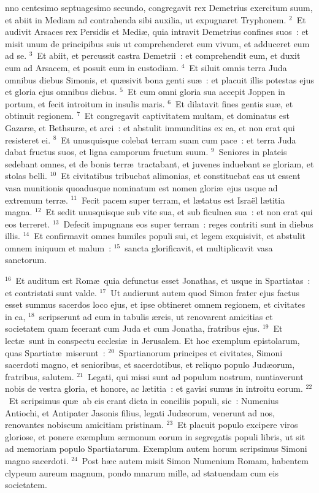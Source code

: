 \bchapter
{}nno centesimo septuagesimo secundo, congregavit rex Demetrius exercitum suum, et abiit in Mediam ad contrahenda sibi auxilia, ut expugnaret Tryphonem.
${}^{2}$~Et audivit Arsaces rex Persidis et Medi\ae , quia intravit Demetrius confines suos~: et misit unum de principibus suis ut comprehenderet eum vivum, et adduceret eum ad se.
${}^{3}$~Et abiit, et percussit castra Demetrii~: et comprehendit eum, et duxit eum ad Arsacem, et posuit eum in custodiam.
${}^{4}$~Et siluit omnis terra Juda omnibus diebus Simonis, et qu\ae sivit bona genti su\ae~: et placuit illis potestas ejus et gloria ejus omnibus diebus.
${}^{5}$~Et cum omni gloria sua accepit Joppen in portum, et fecit introitum in insulis maris.
${}^{6}$~Et dilatavit fines gentis su\ae , et obtinuit regionem.
${}^{7}$~Et congregavit captivitatem multam, et dominatus est Gazar\ae , et Bethsur\ae , et arci~: et abstulit immunditias ex ea, et non erat qui resisteret ei.
${}^{8}$~Et unusquisque colebat terram suam cum pace~: et terra Juda dabat fructus suos, et ligna camporum fructum suum.
${}^{9}$~Seniores in plateis sedebant omnes, et de bonis terr\ae\ tractabant, et juvenes induebant se gloriam, et stolas belli.
${}^{10}$~Et civitatibus tribuebat alimonias, et constituebat eas ut essent vasa munitionis quoadusque nominatum est nomen glori\ae\ ejus usque ad extremum terr\ae .
${}^{11}$~Fecit pacem super terram, et l\ae tatus est Isra\"el l\ae titia magna.
${}^{12}$~Et sedit unusquisque sub vite sua, et sub ficulnea sua~: et non erat qui eos terreret.
${}^{13}$~Defecit impugnans eos super terram~: reges contriti sunt in diebus illis.
${}^{14}$~Et confirmavit omnes humiles populi sui, et legem exquisivit, et abstulit omnem iniquum et malum~:
${}^{15}$~sancta glorificavit, et multiplicavit vasa sanctorum.


${}^{16}$~Et auditum est Rom\ae\ quia defunctus esset Jonathas, et usque in Spartiatas~: et contristati sunt valde.
${}^{17}$~Ut audierunt autem quod Simon frater ejus factus esset summus sacerdos loco ejus, et ipse obtineret omnem regionem, et civitates in ea,
${}^{18}$~scripserunt ad eum in tabulis \ae reis, ut renovarent amicitias et societatem quam fecerant cum Juda et cum Jonatha, fratribus ejus.
${}^{19}$~Et lect\ae\ sunt in conspectu ecclesi\ae\ in Jerusalem. Et hoc exemplum epistolarum, quas Spartiat\ae\ miserunt~:
${}^{20}$~Spartianorum principes et civitates, Simoni sacerdoti magno, et senioribus, et sacerdotibus, et reliquo populo Jud\ae orum, fratribus, salutem.
${}^{21}$~Legati, qui missi sunt ad populum nostrum, nuntiaverunt nobis de vestra gloria, et honore, ac l\ae titia~: et gavisi sumus in introitu eorum.
${}^{22}$~Et scripsimus qu\ae\ ab eis erant dicta in conciliis populi, sic~: Numenius Antiochi, et Antipater Jasonis filius, legati Jud\ae orum, venerunt ad nos, renovantes nobiscum amicitiam pristinam.
${}^{23}$~Et placuit populo excipere viros gloriose, et ponere exemplum sermonum eorum in segregatis populi libris, ut sit ad memoriam populo Spartiatarum. Exemplum autem horum scripsimus Simoni magno sacerdoti.
${}^{24}$~Post h\ae c autem misit Simon Numenium Romam, habentem clypeum aureum magnum, pondo mnarum mille, ad statuendam cum eis societatem.

